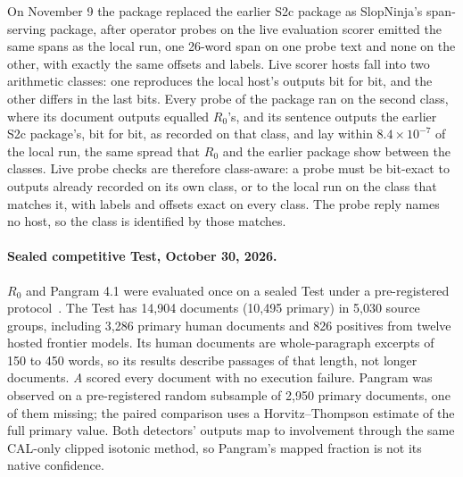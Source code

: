 On November 9 the package replaced the earlier S2c package as SlopNinja's
span-serving package, after operator probes on the live evaluation scorer
emitted the same spans as the local run, one 26-word span on one probe text
and none on the other, with exactly the same offsets and labels. Live scorer
hosts fall into two arithmetic classes: one reproduces the local host's
outputs bit for bit, and the other differs in the last bits. Every probe of the
package ran on the second class, where its document outputs equalled
\(R_0\)'s, and its sentence outputs the earlier S2c package's, bit for bit, as
recorded on that class, and lay within \(8.4\times10^{-7}\) of the local run,
the same spread that \(R_0\) and the earlier package show between the
classes. Live probe checks are therefore class-aware: a probe must be bit-exact
to outputs already recorded on its own class, or to the local run on the class
that matches it, with labels and offsets exact on every class. The probe reply
names no host, so the class is identified by those matches.

\paragraph{Sealed competitive Test, October 30, 2026.}\label{sealed-test-evidence}
\(R_0\) and Pangram 4.1 were evaluated once on a sealed Test under a
pre-registered protocol~\cite{competitiveprotocol}. The Test has 14,904 documents
(10,495 primary) in 5,030 source groups, including 3,286 primary human documents
and 826 positives from twelve hosted frontier models. Its human documents are
whole-paragraph excerpts of 150 to 450 words, so its results describe passages
of that length, not longer documents. \textit{A} scored every
document with no execution failure. Pangram was observed on a pre-registered
random subsample of 2,950 primary documents, one of them missing; the paired
comparison uses a Horvitz--Thompson estimate of the full primary value. Both
detectors' outputs map to involvement through the same CAL-only clipped
isotonic method, so Pangram's mapped fraction is not its native confidence.

